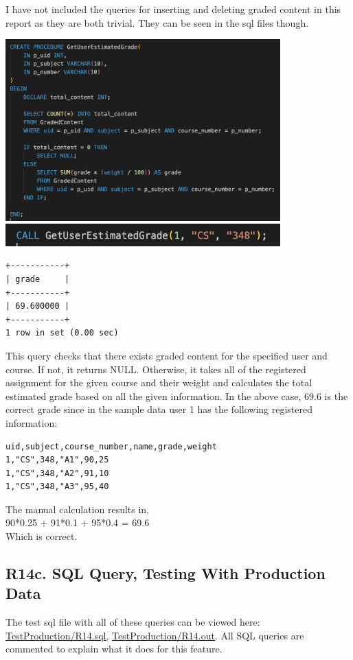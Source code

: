 \documentclass[12pt, a4paper]{article}
\begin{document}
I have not included the queries for inserting and deleting graded content in this report as they are both trivial. They can be seen in the sql files though.

\begin{center}
    \includegraphics[width=400px]{R14/q1}
    \includegraphics[width=400px]{R14/q1_2}
    \begin{verbatim}
+-----------+
| grade     |
+-----------+
| 69.600000 |
+-----------+
1 row in set (0.00 sec)
    \end{verbatim}
\end{center}
This query checks that there exists graded content for the specified user and course. If not, it returns NULL. Otherwise, it takes all of the registered assignment for the given course and their weight and calculates the total estimated grade based on all the given information. In the above case, 69.6 is the correct grade since in the sample data user 1 has the following registered information:
\begin{verbatim}
uid,subject,course_number,name,grade,weight
1,"CS",348,"A1",90,25
1,"CS",348,"A2",91,10
1,"CS",348,"A3",95,40
\end{verbatim}
The manual calculation results in,\\
90*0.25 + 91*0.1 + 95*0.4 = 69.6\\
Which is correct.
\subsection*{R14c. SQL Query, Testing With Production Data}
The test sql file with all of these queries can be viewed here: \underline{\href{https://github.com/Kggupta/DegreeMap/tree/main/Database/Queries/TestProduction}{TestProduction/R14.sql}}, \underline{\href{https://github.com/Kggupta/DegreeMap/tree/main/Database/Queries/TestProduction}{TestProduction/R14.out}}. All SQL queries are commented to explain what it does for this feature.
\end{document}
